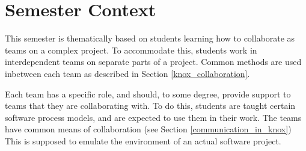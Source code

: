 \section{Semester Context}
This semester is thematically based on students learning how to collaborate as teams on a complex project. 
To accommodate this, students work in interdependent teams on separate parts of a project. 
Common methods are used inbetween each team as described in Section \ref{knox_collaboration}. 

Each team has a specific role, and should, to some degree, provide support to teams that they are collaborating with.
To do this, students are taught certain software process models, and are expected to use them in their work. The teams have common means of collaboration (see Section \ref{communication_in_knox})
This is supposed to emulate the environment of an actual software project. 


% 



% 
